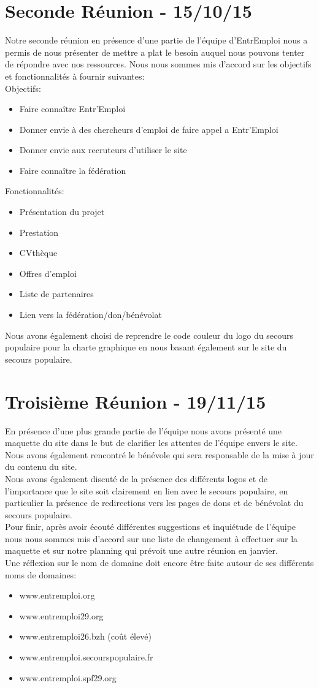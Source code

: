 \documentclass{report}
\begin{document}
\section{Seconde Réunion - 15/10/15}
Notre seconde réunion en présence d'une partie de l'équipe d'EntrEmploi nous a permis de nous présenter de mettre a plat le besoin auquel nous pouvons tenter de répondre avec nos ressources. Nous nous sommes mis d'accord sur les objectifs et fonctionnalités à fournir suivantes:\\
Objectifs:
\begin{itemize}
    \item Faire connaître Entr'Emploi
    \item Donner envie à des chercheurs d'emploi de faire appel a Entr'Emploi
    \item Donner envie aux recruteurs d'utiliser le site
    \item Faire connaître la fédération
\end{itemize}
Fonctionnalités:
\begin{itemize}
    \item Présentation du projet
    \item Prestation
    \item CVthèque
    \item Offres d'emploi
    \item Liste de partenaires
    \item Lien vers la fédération/don/bénévolat
\end{itemize}
Nous avons également choisi de reprendre le code couleur du logo du secours populaire pour la charte graphique en nous basant également sur le site du secours populaire.
\section{Troisième Réunion - 19/11/15}
En présence d'une plus grande partie de l'équipe nous avons présenté une maquette du site dans le but de clarifier les attentes de l'équipe envers le site. Nous avons également rencontré le bénévole qui sera responsable de la mise à jour du contenu du site.\\
Nous avons également discuté de la présence des différents logos et de l'importance que le site soit clairement en lien avec le secours populaire, en particulier la présence de redirections vers les pages de dons et de bénévolat du secours populaire.\\
Pour finir, après avoir écouté différentes suggestions et inquiétude de l'équipe nous nous sommes mis d'accord sur une liste de changement à effectuer sur la maquette et sur notre planning qui prévoit une autre réunion en janvier.\\
Une réflexion sur le nom de domaine doit encore être faite autour de ses différents noms de domaines:
\begin{itemize}
    \item www.entremploi.org 
    \item www.entremploi29.org
    \item www.entremploi26.bzh (coût élevé)
    \item www.entremploi.secourspopulaire.fr
    \item www.entremploi.spf29.org
\end{itemize}
\end{document}
